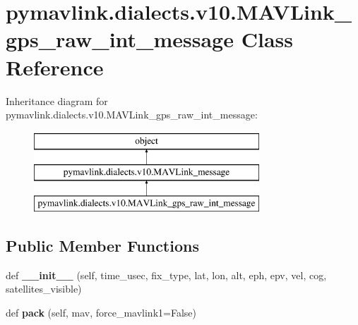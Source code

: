 \hypertarget{classpymavlink_1_1dialects_1_1v10_1_1MAVLink__gps__raw__int__message}{}\section{pymavlink.\+dialects.\+v10.\+M\+A\+V\+Link\+\_\+gps\+\_\+raw\+\_\+int\+\_\+message Class Reference}
\label{classpymavlink_1_1dialects_1_1v10_1_1MAVLink__gps__raw__int__message}
Inheritance diagram for pymavlink.\+dialects.\+v10.\+M\+A\+V\+Link\+\_\+gps\+\_\+raw\+\_\+int\+\_\+message\+:\begin{figure}[H]
\begin{center}
\leavevmode
\includegraphics[height=3.000000cm]{classpymavlink_1_1dialects_1_1v10_1_1MAVLink__gps__raw__int__message}
\end{center}
\end{figure}
\subsection*{Public Member Functions}
\begin{DoxyCompactItemize}
\item 
\mbox{\label{classpymavlink_1_1dialects_1_1v10_1_1MAVLink__gps__raw__int__message_ab5e4d6896ffd34ffcbe4227a27391eba}} 
def {\bfseries \+\_\+\+\_\+init\+\_\+\+\_\+} (self, time\+\_\+usec, fix\+\_\+type, lat, lon, alt, eph, epv, vel, cog, satellites\+\_\+visible)
\item 
\mbox{\label{classpymavlink_1_1dialects_1_1v10_1_1MAVLink__gps__raw__int__message_a4ebc7d5b2cd0a236f1315e4ef465f20c}} 
def {\bfseries pack} (self, mav, force\+\_\+mavlink1=False)
\end{DoxyCompactItemize}
